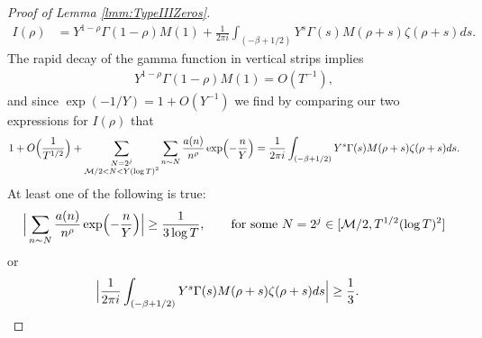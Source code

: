 \documentclass[12pt]{amsart}
\theoremstyle{plain}
\theoremstyle{definition}
\theoremstyle{remark}
\begin{document}
\begin{proof}[Proof of Lemma \ref{lmm:TypeIIIZeros}]
\begin{align*}
I(\rho) &= Y^{1-\rho} \Gamma(1-\rho)M(1) + \frac{1}{2\pi i} \int_{(-\beta + 1/2)} Y^s \Gamma(s) M(\rho+s)\zeta(\rho+s) ds.
\end{align*}
The rapid decay of the gamma function in vertical strips implies
\begin{align*}
Y^{1-\rho} \Gamma(1-\rho)M(1) = O(T^{-1}),
\end{align*}
and since $\exp(-1/Y) = 1+O(Y^{-1})$ we find by comparing our two expressions for $I(\rho)$ that
\begin{align*}
1+O\Bigl(\frac{1}{T^{1/2}}\Bigr) +\sum_{\substack{N=2^j\\ \mathcal{M}/2<N<Y(\log{T})^2}}\sum_{n\sim N}\frac{a(n)}{n^\rho}\exp \Bigl( -\frac{n}{Y}\Bigr)= \frac{1}{2\pi i} \int_{(-\beta + 1/2)} Y^s \Gamma(s) M(\rho+s)\zeta(\rho+s) ds.
\end{align*}
At least one of the following is true:
\begin{align*}%
\Big|\sum_{n\sim N}\frac{a(n)}{n^\rho}\exp \Bigl( -\frac{n}{Y}\Bigr)\Big|\geq \frac{1}{3\log{T}},\qquad\text{for some $N=2^j\in [\mathcal{M}/2,T^{1/2}(\log{T})^2]$}
\end{align*}
or
\begin{align*}%
\Bigl|\frac{1}{2\pi i} \int_{(-\beta + 1/2)} Y^s \Gamma(s) M(\rho+s)\zeta(\rho+s) ds\Bigr| &\geq \frac{1}{3}. \qedhere
\end{align*}
\end{proof}
\end{document}
